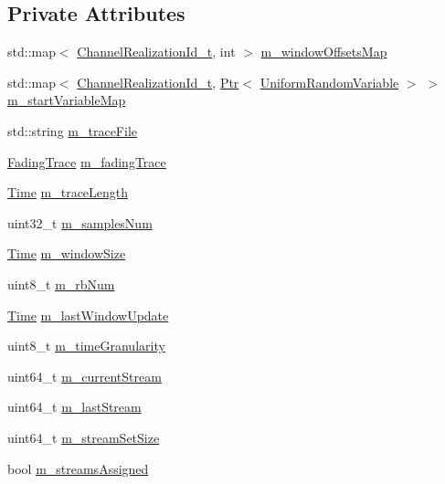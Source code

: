 \subsection*{Private Attributes}
\begin{DoxyCompactItemize}
\item 
std\+::map$<$ \hyperlink{classns3_1_1TraceFadingLossModel_a538fb5e148b837e46a2da767346839d4}{Channel\+Realization\+Id\+\_\+t}, int $>$ \hyperlink{classns3_1_1TraceFadingLossModel_aba701b6e63395fd422f72cd3cd08564a}{m\+\_\+window\+Offsets\+Map}
\item 
std\+::map$<$ \hyperlink{classns3_1_1TraceFadingLossModel_a538fb5e148b837e46a2da767346839d4}{Channel\+Realization\+Id\+\_\+t}, \hyperlink{classns3_1_1Ptr}{Ptr}$<$ \hyperlink{classns3_1_1UniformRandomVariable}{Uniform\+Random\+Variable} $>$ $>$ \hyperlink{classns3_1_1TraceFadingLossModel_a7e4e1717c089e89cb5de897687033354}{m\+\_\+start\+Variable\+Map}
\item 
std\+::string \hyperlink{classns3_1_1TraceFadingLossModel_a29f7251153df4fbe192766508df4d196}{m\+\_\+trace\+File}
\item 
\hyperlink{classns3_1_1TraceFadingLossModel_a909ee0cf2f74bc9914ac283e0ff2eb15}{Fading\+Trace} \hyperlink{classns3_1_1TraceFadingLossModel_ad5a29acc6d4d445fbd31c87f5c750c4d}{m\+\_\+fading\+Trace}
\item 
\hyperlink{classns3_1_1Time}{Time} \hyperlink{classns3_1_1TraceFadingLossModel_a0f900aa679db8209d997e5253e3e16e4}{m\+\_\+trace\+Length}
\item 
uint32\+\_\+t \hyperlink{classns3_1_1TraceFadingLossModel_a48492d3b9b54ac4d50d286079d980bc0}{m\+\_\+samples\+Num}
\item 
\hyperlink{classns3_1_1Time}{Time} \hyperlink{classns3_1_1TraceFadingLossModel_ad872ee7d3fec738e41519fa6562c48fb}{m\+\_\+window\+Size}
\item 
uint8\+\_\+t \hyperlink{classns3_1_1TraceFadingLossModel_a3f742bfca1c1fd4b8dc143942512251a}{m\+\_\+rb\+Num}
\item 
\hyperlink{classns3_1_1Time}{Time} \hyperlink{classns3_1_1TraceFadingLossModel_a3e52ec88812339f8ecf070b9f7645a69}{m\+\_\+last\+Window\+Update}
\item 
uint8\+\_\+t \hyperlink{classns3_1_1TraceFadingLossModel_a279117b6f003c8ad4fe1a32f49ddae18}{m\+\_\+time\+Granularity}
\item 
uint64\+\_\+t \hyperlink{classns3_1_1TraceFadingLossModel_acbbf4b0443de173db3bd48e90581adde}{m\+\_\+current\+Stream}
\item 
uint64\+\_\+t \hyperlink{classns3_1_1TraceFadingLossModel_ad88d7e169a734f6b638d1ebf60f4b6fb}{m\+\_\+last\+Stream}
\item 
uint64\+\_\+t \hyperlink{classns3_1_1TraceFadingLossModel_a0844a523ff1214fcba75f7368a9deebc}{m\+\_\+stream\+Set\+Size}
\item 
bool \hyperlink{classns3_1_1TraceFadingLossModel_a9f490e1d8426c9661d0bd6acdab01104}{m\+\_\+streams\+Assigned}
\end{DoxyCompactItemize}
